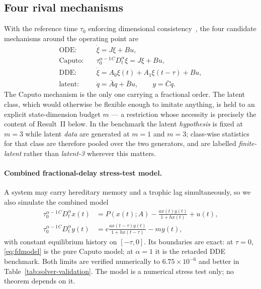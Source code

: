 \subsection{Four rival mechanisms}
With the reference time $\tau_0$ enforcing dimensional consistency~\cite{F02,F03,F04}, the four candidate mechanisms around the operating point are
\begin{align*}
\text{ODE:}&\quad \dot\xi=J\xi+Bu,\\
\text{Caputo:}&\quad \tau_0^{\alpha-1}{}^CD_t^\alpha\xi=J\xi+Bu,\\
\text{DDE:}&\quad \dot\xi=A_0\xi(t)+A_1\xi(t-\tau)+Bu,\\
\text{latent:}&\quad \dot q=\bar A q+\bar Bu,\qquad y=\bar Cq.
\end{align*}
The Caputo mechanism is the only one carrying a fractional order. The latent class, which would otherwise be flexible enough to imitate anything, is held to an explicit state-dimension budget $m$ --- a restriction whose necessity is precisely the content of Result~II below. In the benchmark the latent \emph{hypothesis} is fixed at $m=3$ while latent \emph{data} are generated at $m=1$ and $m=3$; class-wise statistics for that class are therefore pooled over the two generators, and are labelled \emph{finite-latent} rather than \emph{latent-3} wherever this matters.

\paragraph{Combined fractional-delay stress-test model.}
A system may carry hereditary memory and a trophic lag simultaneously, so we also simulate the combined model
\begin{align}
\tau_0^{\alpha-1}{}^CD_t^\alpha x(t)
&=P(x(t);A)-\frac{a x(t)y(t)}{1+h x(t)}+u(t),\\
\tau_0^{\alpha-1}{}^CD_t^\alpha y(t)
&=e\frac{a x(t-\tau)y(t)}{1+h x(t-\tau)}-m y(t),
\label{eq:fdmodel}
\end{align}
with constant equilibrium history on $[-\tau,0]$. Its boundaries are exact: at $\tau=0$, \eqref{eq:fdmodel} is the pure Caputo model; at $\alpha=1$ it is the retarded DDE benchmark. Both limits are verified numerically to $6.75\times10^{-6}$ and better in Table~\ref{tab:solver-validation}. The model is a numerical stress test only; no theorem depends on it.
